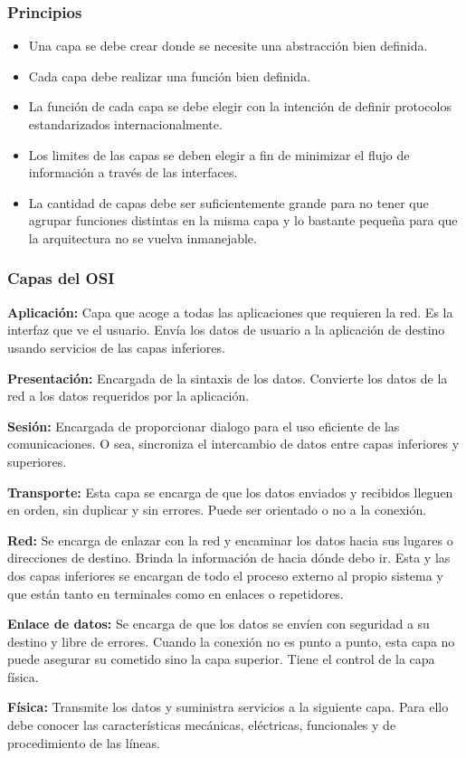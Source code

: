 \documentclass[10pt,a4paper]{article}
\begin{document}
\subsubsection{Principios}
\begin{itemize}
\item Una capa se debe crear donde se necesite una abstracción bien definida.
\item Cada capa debe realizar una función bien definida.
\item La función de cada capa se debe elegir con la intención de definir protocolos estandarizados internacionalmente.
\item Los limites de las capas se deben elegir a fin de minimizar el flujo de información a través de las interfaces.
\item La cantidad de capas debe ser suficientemente grande para no tener que agrupar funciones distintas en la misma capa y lo bastante pequeña para que la arquitectura no se vuelva inmanejable.
\end{itemize}

\subsubsection{Capas del OSI}
\begin{description}
\item \textbf{Aplicación:} Capa que acoge a todas las aplicaciones que requieren la red. Es la interfaz que ve el usuario. Envía los datos de usuario a la aplicación de destino usando servicios de las capas inferiores.
\item \textbf{Presentación:} Encargada de la sintaxis de los datos. Convierte los datos de la red a los datos requeridos por la aplicación.
\item \textbf{Sesión:} Encargada de proporcionar dialogo para el uso eficiente de las comunicaciones. O sea, sincroniza el intercambio de datos entre capas inferiores y superiores.
\item \textbf{Transporte:} Esta capa se encarga de que los datos enviados y recibidos lleguen en orden, sin duplicar y sin errores. Puede ser orientado o no a la conexión.
\item \textbf{Red:} Se encarga de enlazar con la red y encaminar los datos hacia sus lugares o direcciones de destino. Brinda la información de hacia dónde debo ir. Esta y las dos capas inferiores se encargan de todo el proceso externo al propio sistema y que están tanto en terminales como en enlaces o repetidores.
\item \textbf{Enlace de datos:} Se encarga de que los datos se envíen con seguridad a su destino y libre de errores. Cuando la conexión no es punto a punto, esta capa no puede asegurar su cometido sino la capa superior. Tiene el control de la capa física.
\item \textbf{Física:} Transmite los datos y suministra servicios a la siguiente capa. Para ello debe conocer las características mecánicas, eléctricas, funcionales y de procedimiento de las líneas.
\end{description}
\end{document}
